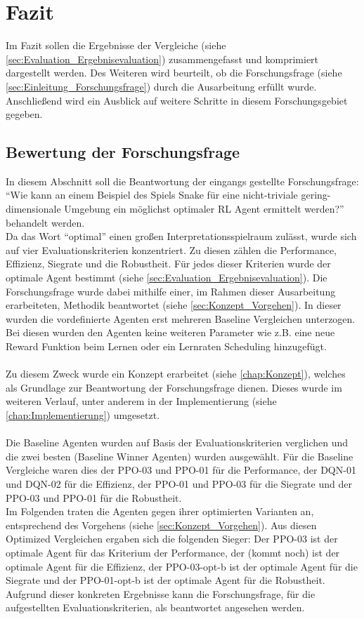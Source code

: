 \chapter{Fazit}
Im Fazit sollen die Ergebnisse der Vergleiche (siehe \ref{sec:Evaluation_Ergebnisevaluation}) zusammengefasst und komprimiert dargestellt werden. Des Weiteren wird beurteilt, ob die Forschungsfrage (siehe \ref{sec:Einleitung_Forschungsfrage}) durch die Ausarbeitung erfüllt wurde.
Anschließend wird ein Ausblick auf weitere Schritte in diesem Forschungsgebiet gegeben.

\section{Bewertung der Forschungsfrage}
In diesem Abschnitt soll die Beantwortung der eingangs gestellte Forschungsfrage:\\
"`Wie kann an einem Beispiel des Spiels Snake für eine nicht-triviale gering-dimensionale Umgebung ein möglichst optimaler RL Agent ermittelt werden?"' behandelt werden.\\
Da das Wort "`optimal"' einen großen Interpretationsspielraum zulässt, wurde sich auf vier Evaluationskriterien konzentriert. Zu diesen zählen die Performance, Effizienz, Siegrate und die Robustheit. Für jedes dieser Kriterien wurde der optimale Agent bestimmt (siehe \ref{sec:Evaluation_Ergebnisevaluation}).
Die Forschungsfrage wurde dabei mithilfe einer, im Rahmen dieser Ausarbeitung erarbeiteten, Methodik beantwortet (siehe \ref{sec:Konzept_Vorgehen}).
In dieser wurden die vordefinierte Agenten erst mehreren Baseline Vergleichen unterzogen. Bei diesen wurden den Agenten keine weiteren Parameter wie z.B. eine neue Reward Funktion beim Lernen oder ein Lernraten Scheduling hinzugefügt.\\
\\Zu diesem Zweck wurde ein Konzept erarbeitet (siehe \ref{chap:Konzept}), welches als Grundlage zur Beantwortung der Forschungsfrage dienen. Dieses wurde im weiteren Verlauf, unter anderem in der Implementierung (siehe \ref{chap:Implementierung}) umgesetzt.\\
\\Die Baseline Agenten wurden auf Basis der Evaluationskriterien verglichen und die zwei besten (Baseline Winner Agenten) wurden ausgewählt. Für die Baseline Vergleiche waren dies der PPO-03 und PPO-01 für die Performance, der DQN-01 und DQN-02 für die Effizienz, der PPO-01 und PPO-03 für die Siegrate und der PPO-03 und PPO-01 für die Robustheit.\\
Im Folgenden traten die Agenten gegen ihrer optimierten Varianten an, entsprechend des Vorgehens (siehe \ref{sec:Konzept_Vorgehen}).
Aus diesen Optimized Vergleichen ergaben sich die folgenden Sieger: Der PPO-03 ist der optimale Agent für das Kriterium der Performance, der (kommt noch) ist der optimale Agent für die Effizienz, der PPO-03-opt-b ist der optimale Agent für die Siegrate und der PPO-01-opt-b ist der optimale Agent für die Robustheit.\\
Aufgrund dieser konkreten Ergebnisse kann die Forschungsfrage, für die aufgestellten Evaluationskriterien, als beantwortet angesehen werden.

